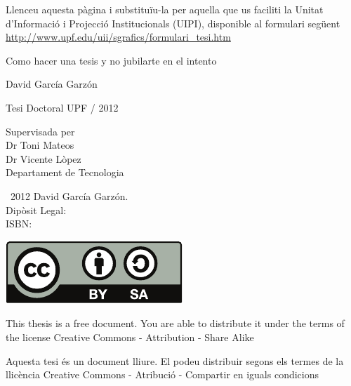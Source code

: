 \documentclass[10pt,b5paper,twoside,showtrims,openright]{memoir}
\begin{document}


\thispagestyle{empty}

\noindent
Llenceu aquesta pàgina i substituïu-la per aquella que us faciliti
la Unitat d'Informació i Projecció Institucionals (UIPI),
disponible al formulari següent\\
\url{http://www.upf.edu/uii/sgrafics/formulari_tesi.htm}
\cleartorecto

\begin{titlingpage}
\begin{center}
        \vspace*{1cm} %
  {\Huge Como hacer una tesis y no jubilarte en el intento}

        \vspace{8mm} %
        {\LARGE David García Garzón}

        \vspace*{\fill} %
        {\Large Tesi Doctoral UPF / 2012}

        \vspace*{\fill}
        {\normalsize Supervisada per}\\[2mm]
        {\Large Dr Toni Mateos}\\[1mm]
        {\Large Dr Vicente Lòpez}\\[1mm]
        {\large Departament de Tecnologia}

        \vspace{2cm}
\end{center}
\newpage

\noindent
\raisebox{0.2ex}{\textcopyright}\  2012
David García Garzón.\\
Dipòsit Legal:\\
ISBN:

\vspace{1cm}
\footnotesize

\noindent
\includegraphics{cc-by-sa}

\noindent
This thesis is a free document.
You are able to distribute it under the terms of the license
Creative Commons - Attribution - Share Alike

\noindent
Aquesta tesi és un document lliure.
El podeu distribuir segons els termes de la llicència
Creative Commons - Atribució - Compartir en iguals condicions

\end{titlingpage}
\end{document}
